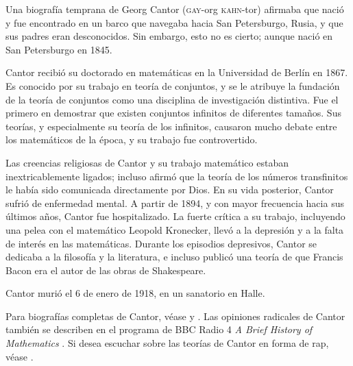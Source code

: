 \documentclass[../../../include/open-logic-section]{subfiles}
\begin{document}



Una biografía temprana de Georg Cantor (\textsc{gay}-org \textsc{kahn}-tor) afirmaba que nació y fue encontrado en un barco que navegaba hacia San Petersburgo, Rusia, y que sus padres eran desconocidos. Sin embargo, esto no es cierto; aunque nació en San Petersburgo en 1845.

Cantor recibió su doctorado en matemáticas en la Universidad de Berlín en 1867. Es conocido por su trabajo en teoría de conjuntos, y se le atribuye la fundación de la teoría de conjuntos como una disciplina de investigación distintiva. Fue el primero en demostrar que existen conjuntos infinitos de diferentes tamaños. Sus teorías, y especialmente su teoría de los infinitos, causaron mucho debate entre los matemáticos de la época, y su trabajo fue controvertido.

Las creencias religiosas de Cantor y su trabajo matemático estaban inextricablemente ligados; incluso afirmó que la teoría de los números transfinitos le había sido comunicada directamente por Dios. En su vida posterior, Cantor sufrió de enfermedad mental. A partir de 1894, y con mayor frecuencia hacia sus últimos años, Cantor fue hospitalizado. La fuerte crítica a su trabajo, incluyendo una pelea con el matemático Leopold Kronecker, llevó a la depresión y a la falta de interés en las matemáticas. Durante los episodios depresivos, Cantor se dedicaba a la filosofía y la literatura, e incluso publicó una teoría de que Francis Bacon era el autor de las obras de Shakespeare.

Cantor murió el 6 de enero de 1918, en un sanatorio en Halle.

\begin{reading}
Para biografías completas de Cantor, véase \citet{Dauben1990} y \citet{Grattan-Guinness1971}. Las opiniones radicales de Cantor también se describen en el programa de BBC Radio 4 \emph{A Brief History of Mathematics} \citep{Sautoy2014}. Si desea escuchar sobre las teorías de Cantor en forma de rap, véase \citet{Rose2012}.
\end{reading}
\end{document}
